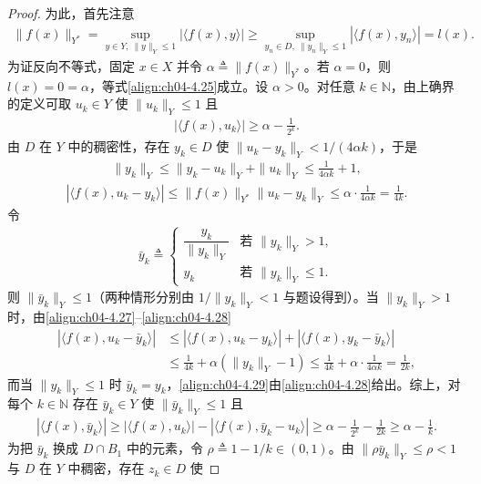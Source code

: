 \documentclass[../../main.tex]{subfiles}%
\begin{document}
\begin{proof}
为此，首先注意
\begin{align*}
\|f(x)\|_{Y^*}=\sup_{y\in Y,\ \|y\|_Y\leqslant1}|\langle f(x),y\rangle|\geqslant\sup_{y_n\in D,\ \|y_n\|_Y\leqslant1}|\langle f(x),y_n\rangle|=l(x).
\end{align*}
为证反向不等式，固定 $x\in X$ 并令 $\alpha\triangleq\|f(x)\|_{Y^*}$。若 $\alpha=0$，则 $l(x)=0=\alpha$，等式\eqref{align:ch04-4.25}成立。设 $\alpha>0$。对任意 $k\in\mathbb{N}$，由上确界的定义可取 $u_k\in Y$ 使 $\|u_k\|_Y\leqslant1$ 且
\begin{align}
|\langle f(x),u_k\rangle|\geqslant\alpha-\frac1{2^k}. \label{align:ch04-4.26}
\end{align}
由 $D$ 在 $Y$ 中的稠密性，存在 $y_k\in D$ 使 $\|u_k-y_k\|_Y<1/(4\alpha k)$，于是
\begin{align}
\|y_k\|_Y\leqslant\|y_k-u_k\|_Y+\|u_k\|_Y\leqslant\frac1{4\alpha k}+1, \label{align:ch04-4.27}
\end{align}
\begin{align}
|\langle f(x),u_k-y_k\rangle|\leqslant\|f(x)\|_{Y^*}\|u_k-y_k\|_Y\leqslant\alpha\cdot\frac1{4\alpha k}=\frac1{4k}. \label{align:ch04-4.28}
\end{align}
令
\begin{align*}
\bar y_k\triangleq
\begin{cases}
\dfrac{y_k}{\|y_k\|_Y} & \text{若 }\|y_k\|_Y>1,\\
y_k & \text{若 }\|y_k\|_Y\leqslant1.
\end{cases}
\end{align*}
则 $\|\bar y_k\|_Y\leqslant1$（两种情形分别由 $1/\|y_k\|_Y<1$ 与题设得到）。当 $\|y_k\|_Y>1$ 时，由\eqref{align:ch04-4.27}--\eqref{align:ch04-4.28}
\begin{align}
|\langle f(x),u_k-\bar y_k\rangle|
&\leqslant|\langle f(x),u_k-y_k\rangle|+|\langle f(x),y_k-\bar y_k\rangle|\nonumber\\
&\leqslant\frac1{4k}+\alpha(\|y_k\|_Y-1)\leqslant\frac1{4k}+\alpha\cdot\frac1{4\alpha k}=\frac1{2k}, \label{align:ch04-4.29}
\end{align}
而当 $\|y_k\|_Y\leqslant1$ 时 $\bar y_k=y_k$，\eqref{align:ch04-4.29}由\eqref{align:ch04-4.28}给出。综上，对每个 $k\in\mathbb{N}$ 存在 $\bar y_k\in Y$ 使 $\|\bar y_k\|_Y\leqslant1$ 且
\begin{align*}
|\langle f(x),\bar y_k\rangle|\geqslant|\langle f(x),u_k\rangle|-|\langle f(x),\bar y_k-u_k\rangle|\geqslant\alpha-\frac1{2^k}-\frac1{2k}\geqslant\alpha-\frac1k.
\end{align*}
为把 $\bar y_k$ 换成 $D\cap B_1$ 中的元素，令 $\rho\triangleq1-1/k\in(0,1)$。由 $\|\rho\bar y_k\|_Y\leqslant\rho<1$ 与 $D$ 在 $Y$ 中稠密，存在 $z_k\in D$ 使

\end{proof}
\end{document}
